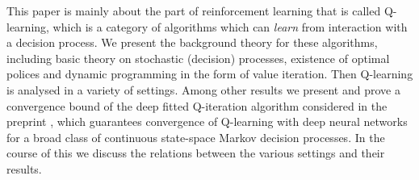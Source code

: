 
This paper is mainly about the part of reinforcement learning that is called
Q-learning, which is a category of algorithms which can \emph{learn} from
interaction with a decision process.
We present the background theory for these algorithms,
including basic theory on stochastic (decision) processes,
existence of optimal polices and
dynamic programming in the form of value iteration.
Then Q-learning is analysed in a variety of settings.
Among other results we present and prove a convergence bound of the
deep fitted Q-iteration algorithm considered in the preprint ,
which guarantees convergence of Q-learning with deep neural networks
for a broad class of continuous state-space Markov decision processes.
In the course of this we discuss the relations between the various settings
and their results.
